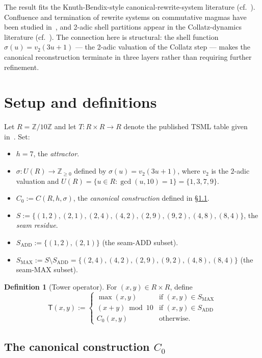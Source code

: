 \documentclass[11pt,reqno]{amsart}
\theoremstyle{plain}
\theoremstyle{definition}
\newtheorem{definition}[theorem]{Definition}
\begin{document}
The result fits the Knuth-Bendix-style canonical-rewrite-system
literature (cf.~\cite{knuthBendix1970, bergman1978}). Confluence
and termination of rewrite systems on commutative magmas have been
studied in~\cite{ohlebusch2002, klop1992}, and 2-adic shell partitions
appear in the Collatz-dynamics literature (cf.~\cite{lagarias2010}).
The connection here is structural: the shell function
$\sigma(u) = v_2(3u + 1)$ — the 2-adic valuation of the Collatz step
— makes the canonical reconstruction terminate in three layers
rather than requiring further refinement.

\section{Setup and definitions}

Let $R = \mathbb{Z}/10\mathbb{Z}$ and let $T : R \times R \to R$
denote the published TSML table given in~\cite{ckTables}. Set:

\begin{itemize}
\item $h = 7$, the \emph{attractor}.
\item $\sigma : U(R) \to \mathbb{Z}_{\geq 0}$ defined by
$\sigma(u) = v_2(3u + 1)$, where $v_2$ is the $2$-adic valuation
and $U(R) = \{u \in R : \gcd(u, 10) = 1\} = \{1, 3, 7, 9\}$.
\item $C_0 := C(R, h, \sigma)$, the \emph{canonical construction}
defined in §\ref{sec:c0}.
\item $S := \{(1,2), (2,1), (2,4), (4,2), (2,9), (9,2), (4,8), (8,4)\}$,
the \emph{seam residue}.
\item $S_{\mathrm{ADD}} := \{(1,2), (2,1)\}$ (the seam-ADD subset).
\item $S_{\mathrm{MAX}} := S \setminus S_{\mathrm{ADD}} = \{(2,4),
(4,2), (2,9), (9,2), (4,8), (8,4)\}$ (the seam-MAX subset).
\end{itemize}

\begin{definition}[Tower operator]
For $(x, y) \in R \times R$, define
\[
\mathsf{T}(x, y) := \begin{cases}
\max(x, y) & \text{if } (x, y) \in S_{\mathrm{MAX}} \\
(x + y) \bmod 10 & \text{if } (x, y) \in S_{\mathrm{ADD}} \\
C_0(x, y) & \text{otherwise.}
\end{cases}
\]
\end{definition}

\subsection{The canonical construction $C_0$}\label{sec:c0}
\end{document}

